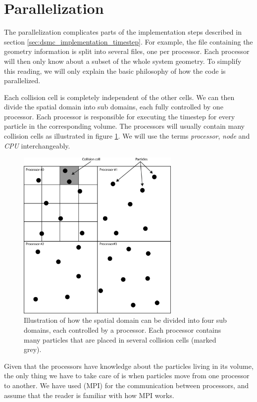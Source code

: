 \section{Parallelization}
\label{sec:dmsc_parallelization}
The parallelization complicates parts of the implementation steps described in section \ref{sec:dsmc_implementation_timestep}. For example, the file containing the geometry information is split into several files, one per processor. Each processor will then only know about a subset of the whole system geometry. To simplify this reading, we will only explain the basic philosophy of how the code is parallelized.

Each collision cell is completely independent of the other cells. We can then divide the spatial domain into sub domains, each fully controlled by one processor. Each processor is responsible for executing the timestep for every particle in the corresponding volume. The processors will usually contain many collision cells as illustrated in figure \ref{fig:dsmc_parallelization_1}. We will use the terms \textit{processor}, \textit{node} and \textit{CPU} interchangeably.
\begin{figure}[htb]
\begin{center}
\includegraphics[width=0.7\textwidth, trim=0cm 0cm 0cm 0cm, clip]{DSMC/figures/parallelization.eps}
\end{center}
\caption{Illustration of how the spatial domain can be divided into four sub domains, each controlled by a processor. Each processor contains many particles that are placed in several collision cells (marked grey).}
\label{fig:dsmc_parallelization_1}
\end{figure}
Given that the processors have knowledge about the particles living in its volume, the only thing we have to take care of is when particles move from one processor to another. We have used (MPI) for the communication between processors, and assume that the reader is familiar with how MPI works. 

